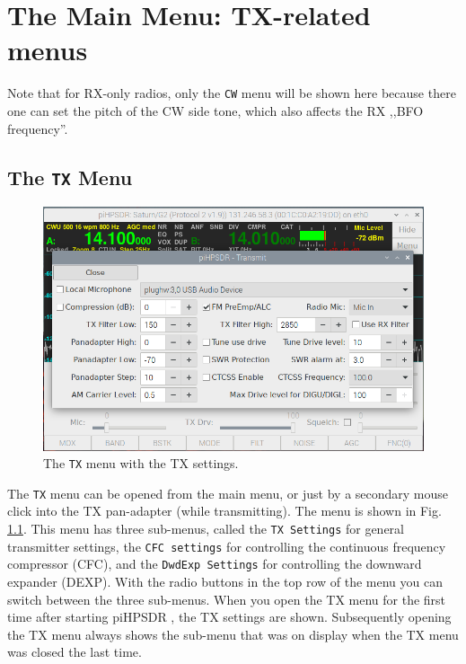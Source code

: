 \documentclass[12pt]{book}
\def\rett#1{\texttt{\color{red}#1}}
\def\bltt#1{\texttt{\color{blue}#1}}
\def\pH{pi\-HPSDR }
\begin{document}
\chapter[TX-related menus]{The Main Menu: TX-related menus}

Note that for RX-only radios, only the \bltt{CW} menu will be shown here
because there one can set the pitch of the CW side tone, which also affects
the RX ,,BFO frequency''.

\section{The \texttt{TX} Menu}
\label{sec:txmenu}
\begin{figure}[ht!]
\center
\includegraphics[width=12cm]{TXMenu.png}
\caption{The \bltt{TX} menu with the TX settings.}
\label{fig:TXMenu}
\end{figure}

The \bltt{TX} menu can be opened from the main menu, or just by a secondary mouse click
into the TX pan-adapter (while transmitting). The menu is shown in Fig. \ref{fig:TXMenu}.
This menu has three sub-menus, called the \rett{TX Settings} for general transmitter settings,
the \rett{CFC settings} for controlling the continuous frequency compressor (CFC), and the
\rett{DwdExp Settings} for controlling the downward expander (DEXP). With the radio buttons
in the top row of the menu you can switch between the three sub-menus. When you open the TX
menu for the first time after starting \pH, the TX settings are shown. Subsequently opening
the TX menu always shows the sub-menu that was on display when the TX  menu was closed the last
time.
\end{document}
